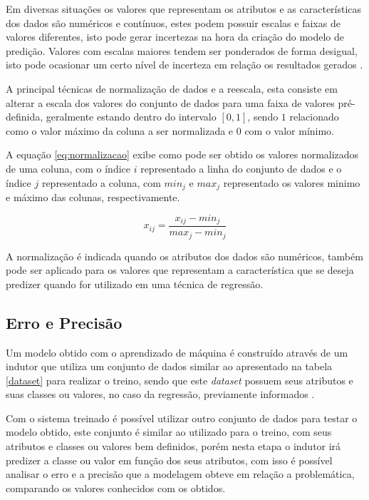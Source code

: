 \documentclass[
12pt,				%
oneside,			%
a4paper,			%
english,			%
french,				%
spanish,			%
brazil				%
]{abntex2}
\begin{document}
Em diversas situações os valores que representam os atributos e as características dos dados são numéricos e contínuos, estes podem possuir escalas e faixas de valores diferentes, isto pode gerar incertezas na hora da criação do modelo de predição. Valores com escalas maiores tendem ser ponderados de forma desigual, isto pode ocasionar um certo nível de incerteza em relação os resultados gerados \cite{faceli2011inteligencia}. 

A principal técnicas  de normalização de dados e a reescala, esta consiste em alterar a escala dos valores do conjunto de dados para uma faixa de valores pré-definida, geralmente estando dentro do intervalo $[0,1]$, sendo $1$ relacionado como o valor máximo da coluna a ser normalizada e $0$ com o valor mínimo. 

A equação \ref{eq:normalizacao} exibe como pode ser obtido os valores normalizados de uma coluna, com o índice $i$ representado a linha do conjunto de dados e o índice $j$ representado a coluna, com $min_{j}$ e $max_{j}$ representado os valores minimo e máximo das colunas, respectivamente. 

\begin{equation}
x_{ij} = \frac{x_{ij} - min_{j}}{max_{j}-min_{j}} 
\label{eq:normalizacao}
\end{equation} 

A normalização é indicada quando os atributos dos dados são numéricos, também pode ser aplicado para os valores que representam a característica que se deseja predizer quando for utilizado em uma técnica de regressão.

\subsection{Erro e Precisão}

Um modelo obtido com o aprendizado de máquina é construído através de um indutor que  utiliza um conjunto de dados similar ao apresentado na tabela \ref{dataset} para realizar o treino, sendo que este \textit{dataset} possuem seus atributos e suas classes ou valores, no caso da regressão, previamente informados \cite{kaufman1998discovery}. 

Com o sistema treinado é possível utilizar outro conjunto de dados para testar o modelo obtido, este conjunto é similar ao utilizado para o treino, com seus atributos e classes ou valores bem definidos, porém nesta etapa o indutor irá predizer a classe ou valor em função dos seus atributos, com isso é possível analisar o erro e a precisão que a modelagem obteve em relação a problemática, comparando os valores conhecidos com os obtidos.
\end{document}
